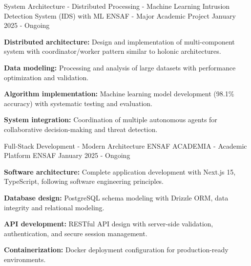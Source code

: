 
\begin{cventries}

    \cventry
    {System Architecture - Distributed Processing - Machine Learning}
    {Intrusion Detection System (IDS) with ML} %
    {ENSAF - Major Academic Project} %
    {January 2025 - Ongoing} %
    {
        \begin{cvitems}
            \item {
                        \textbf{Distributed architecture:} Design and implementation of multi-component system with coordinator/worker pattern similar to holonic architectures.}
            \item {
                        \textbf{Data modeling:} Processing and analysis of large datasets with performance optimization and validation.}
            \item {
                        \textbf{Algorithm implementation:} Machine learning model development (98.1\% accuracy) with systematic testing and evaluation.}
            \item {
                        \textbf{System integration:} Coordination of multiple autonomous agents for collaborative decision-making and threat detection.}
        \end{cvitems}
    }

    \cventry
    {Full-Stack Development - Modern Architecture}
    {ENSAF ACADEMIA - Academic Platform} %
    {ENSAF} %
    {January 2025 - Ongoing} %
    {
        \begin{cvitems}
            \item {
                        \textbf{Software architecture:} Complete application development with Next.js 15, TypeScript, following software engineering principles.}
            \item {
                        \textbf{Database design:} PostgreSQL schema modeling with Drizzle ORM, data integrity and relational modeling.}
            \item {
                        \textbf{API development:} RESTful API design with server-side validation, authentication, and secure session management.}
            \item {
                        \textbf{Containerization:} Docker deployment configuration for production-ready environments.}
        \end{cvitems}
    }


\end{cventries}

